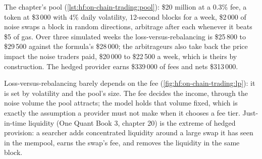 The chapter's pool (\cref{lst:hf:on-chain-trading:pool}): \$20 million at a 0.3\% fee, a token at \$3\,000 with 4\% daily volatility, 12-second blocks
for a week, \$2\,000 of noise swaps a block in random directions, arbitrage after each whenever it beats \$5 of gas. Over three simulated weeks the
loss-versus-rebalancing is \$25\,800 to \$29\,500 against the formula's \$28\,000; the arbitrageurs also take back the price impact the noise traders
paid, \$20\,000 to \$22\,500 a week, which is theirs by construction. The hedged provider earns \$339\,000 of fees and nets \$313\,000.

\begin{omfigure}

\label{fig:hf:on-chain-trading:lp}
\end{omfigure}

Loss-versus-rebalancing barely depends on the fee (\cref{fig:hf:on-chain-trading:lp}): it is set by volatility and the pool's size. The fee decides
the income, through the noise volume the pool attracts; the model holds that volume fixed, which is exactly the assumption a provider must not
make when it chooses a fee tier. Just-in-time liquidity (One Quant Book 3, chapter 20) is the extreme of hedged provision: a searcher adds
concentrated liquidity around a large swap it has seen in the mempool, earns the swap's fee, and removes the liquidity in the same block.

